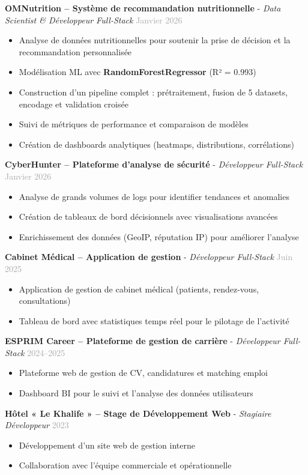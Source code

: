 \documentclass[10pt,a4paper]{article}
\newcommand{\cventry}[3]{
    \noindent\textbf{\textcolor{mainblue}{#1}} - \textit{#2} \hfill \textcolor{darkgray}{#3}
}
\begin{document}
\cventry{OMNutrition – Système de recommandation nutritionnelle}{Data Scientist \& Développeur Full-Stack}{Janvier 2026}
\begin{itemize}
\item Analyse de données nutritionnelles pour soutenir la prise de décision et la recommandation personnalisée
\item Modélisation ML avec \textbf{RandomForestRegressor} (R² = 0.993)
\item Construction d’un pipeline complet : prétraitement, fusion de 5 datasets, encodage et validation croisée
\item Suivi de métriques de performance et comparaison de modèles
\item Création de dashboards analytiques (heatmaps, distributions, corrélations)
\end{itemize}

\cventry{CyberHunter – Plateforme d’analyse de sécurité}{Développeur Full-Stack}{Janvier 2026}
\begin{itemize}
\item Analyse de grands volumes de logs pour identifier tendances et anomalies
\item Création de tableaux de bord décisionnels avec visualisations avancées
\item Enrichissement des données (GeoIP, réputation IP) pour améliorer l’analyse
\end{itemize}

\cventry{Cabinet Médical – Application de gestion}{Développeur Full-Stack}{Juin 2025}
\begin{itemize}
\item Application de gestion de cabinet médical (patients, rendez-vous, consultations)
\item Tableau de bord avec statistiques temps réel pour le pilotage de l’activité
\end{itemize}

\cventry{ESPRIM Career – Plateforme de gestion de carrière}{Développeur Full-Stack}{2024–2025}
\begin{itemize}
\item Plateforme web de gestion de CV, candidatures et matching emploi
\item Dashboard BI pour le suivi et l’analyse des données utilisateurs
\end{itemize}

\cventry{Hôtel « Le Khalife » – Stage de Développement Web}{Stagiaire Développeur}{2023}
\begin{itemize}
\item Développement d’un site web de gestion interne
\item Collaboration avec l’équipe commerciale et opérationnelle
\end{itemize}
\end{document}
